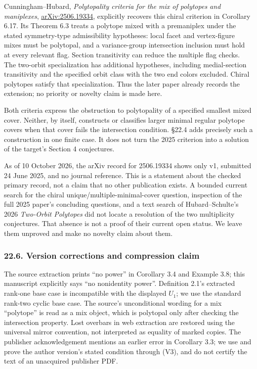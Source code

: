 \documentclass[
  10pt,
  letterpaper,
]{article}
\begin{document}
Cunningham--Hubard, \emph{Polytopality criteria for the mix of polytopes
and maniplexes},
\href{https://arxiv.org/abs/2506.19334}{arXiv:2506.19334}, explicitly
recovers this chiral criterion in Corollary 6.17. Its Theorem 6.3 treats
a polytope mixed with a premaniplex under the stated symmetry-type
admissibility hypotheses: local facet and vertex-figure mixes must be
polytopal, and a variance-group intersection inclusion must hold at
every relevant flag. Section transitivity can reduce the multiple flag
checks. The two-orbit specialization has additional hypotheses,
including medial-section transitivity and the specified orbit class with
the two end colors excluded. Chiral polytopes satisfy that
specialization. Thus the later paper already records the extension; no
priority or novelty claim is made here.

Both criteria express the obstruction to polytopality of a specified
smallest mixed cover. Neither, by itself, constructs or classifies
larger minimal regular polytope covers when that cover fails the
intersection condition. §22.4 adds precisely such a construction in one
finite case. It does not turn the 2025 criterion into a solution of the
target's Section 4 conjectures.

As of 10 October 2026, the arXiv record for 2506.19334 shows only v1,
submitted 24 June 2025, and no journal reference. This is a statement
about the checked primary record, not a claim that no other publication
exists. A bounded current search for the chiral
unique/multiple-minimal-cover question, inspection of the full 2025
paper's concluding questions, and a text search of Hubard--Schulte's
2026 \emph{Two-Orbit Polytopes} did not locate a resolution of the two
multiplicity conjectures. That absence is not a proof of their current
open status. We leave them unproved and make no novelty claim about
them.

\subsubsection{22.6. Version corrections and compression
claim}\label{version-corrections-and-compression-claim}

The source extraction prints ``no power'' in Corollary 3.4 and Example
3.8; this manuscript explicitly says ``no nonidentity power''.
Definition 2.1's extracted rank-one base case is incompatible with the
displayed \(U_1\); we use the standard rank-two cyclic base case. The
source's unconditional wording for a mix ``polytope'' is read as a mix
object, which is polytopal only after checking the intersection
property. Lost overbars in web extraction are restored using the
universal mirror convention, not interpreted as equality of marked
copies. The publisher acknowledgement mentions an earlier error in
Corollary 3.3; we use and prove the author version's stated condition
through (V3), and do not certify the text of an unacquired publisher
PDF.
\end{document}
